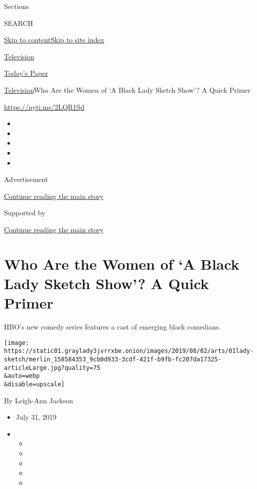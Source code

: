 Sections

SEARCH

\protect\hyperlink{site-content}{Skip to
content}\protect\hyperlink{site-index}{Skip to site index}

\href{https://www.nytimes3xbfgragh.onion/section/arts/television}{Television}

\href{https://myaccount.nytimes3xbfgragh.onion/auth/login?response_type=cookie\&client_id=vi}{}

\href{https://www.nytimes3xbfgragh.onion/section/todayspaper}{Today's
Paper}

\href{/section/arts/television}{Television}\textbar{}Who Are the Women
of `A Black Lady Sketch Show'? A Quick Primer

\url{https://nyti.ms/2LQR1Sd}

\begin{itemize}
\item
\item
\item
\item
\item
\end{itemize}

Advertisement

\protect\hyperlink{after-top}{Continue reading the main story}

Supported by

\protect\hyperlink{after-sponsor}{Continue reading the main story}

\hypertarget{who-are-the-women-of-a-black-lady-sketch-show-a-quick-primer}{%
\section{Who Are the Women of `A Black Lady Sketch Show'? A Quick
Primer}\label{who-are-the-women-of-a-black-lady-sketch-show-a-quick-primer}}

HBO's new comedy series features a cast of emerging black comedians.

\texttt{[image: https://static01.graylady3jvrrxbe.onion/images/2019/08/02/arts/01lady-sketch/merlin\_158584353\_9cb0d933-3cdf-421f-b9fb-fc207da17325-articleLarge.jpg?quality=75\\\&auto=webp\\\&disable=upscale]}

By Leigh-Ann Jackson

\begin{itemize}
\item
  July 31, 2019
\item
  \begin{itemize}
  \item
  \item
  \item
  \item
  \item
  \end{itemize}
\end{itemize}

